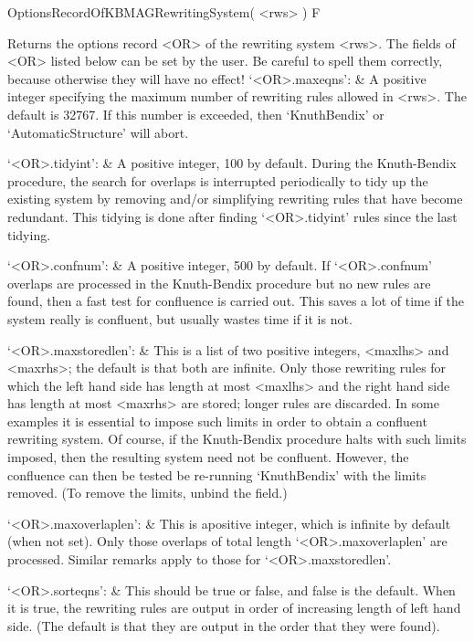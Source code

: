 \>OptionsRecordOfKBMAGRewritingSystem( <rws> ) F

Returns the options record <OR> of the rewriting system <rws>. The
fields of <OR> listed below can be set by the user. Be careful to spell
them correctly, because otherwise they will have no effect!
\beginitems
`<OR>.maxeqns': & 
        A positive integer specifying  the maximum number of rewriting
	rules allowed in <rws>.  The  default is 32767. If this number
	is exceeded, then `KnuthBendix' or `AutomaticStructure' will abort.

`<OR>.tidyint': &
	A positive integer,  100 by default.  During the  Knuth-Bendix
	procedure, the search for overlaps is interrupted periodically
	to tidy up the existing system  by removing and/or simplifying
	rewriting rules  that have become  redundant. This  tidying is
	done  after    finding `<OR>.tidyint' rules    since the last
	tidying.

`<OR>.confnum': &
	A  positive integer, 500    by  default.  If   `<OR>.confnum'
	overlaps are processed  in  the Knuth-Bendix procedure  but no
	new rules  are  found, then  a  fast test  for confluence   is
	carried out. This saves a lot of time  if the system really is
	confluent, but usually wastes time if it is not.

`<OR>.maxstoredlen': &
        This    is a list   of  two   positive integers, <maxlhs>  and
	<maxrhs>; the  default is that both  are infinite.  Only those
	rewriting rules for  which the  left hand  side has  length at
	most   <maxlhs>  and the right hand    side has length at most
	<maxrhs> are stored;  longer   rules are  discarded. In   some
	examples it  is essential to   impose such limits in order  to
	obtain  a  confluent  rewriting   system. Of  course, if   the
	Knuth-Bendix procedure  halts with  such limits imposed,  then
	the    resulting system need   not be  confluent. However, the
	confluence can  then be  tested be  re-running `KnuthBendix'  with  the
	limits removed.  (To remove the  limits, unbind the field.)

`<OR>.maxoverlaplen': &
	This  is apositive integer, which  is  infinite by default (when not
	set).      Only      those    overlaps     of   total   length
	`<OR>.maxoverlaplen'  are processed. Similar remarks apply to
	those for `<OR>.maxstoredlen'.

`<OR>.sorteqns': &
	This should be true or false, and false  is the default.  When
	it is  true,   the rewriting  rules  are output  in order   of
	increasing length  of left  hand  side.  (The  default is that
	they are output in the order that they were found).

